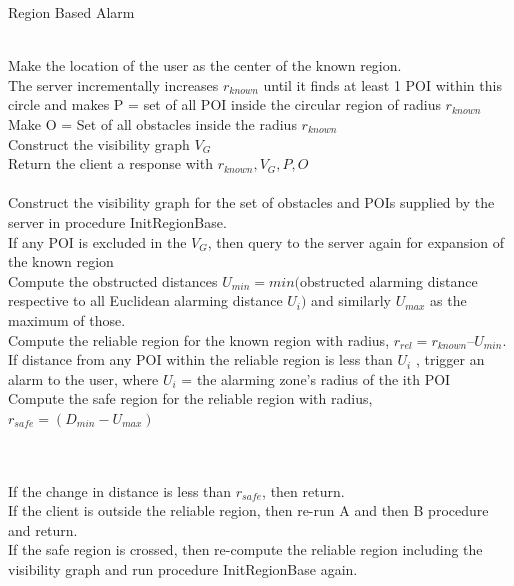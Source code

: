 \documentclass{sig-alternate}
\begin{document}
\begin{algorithm}
\caption{Region Based Alarm}
\label{InitRegionBase}
\begin{algorithmic}[1]
\\ Make the location of the user as the center of the known region. 
\\ The server incrementally increases $r_{known}$ until it finds at least 1 POI within this circle and makes P = {set of all POI inside the circular region of radius $r_{known}$}
\\ Make O = {Set of all obstacles inside the radius $r_{known}$}
\\ Construct the visibility graph $V_G$
\\ Return the client a response with ${r_{known}, V_G, P, O}$
\EndProcedure
\\
\\ Construct the visibility graph for the set of obstacles and POIs supplied by the server in procedure InitRegionBase.
\\ If any POI is excluded in the $V_G$, then query to the server again for expansion of the known region
\\ Compute the obstructed distances $U_{min} = min($obstructed alarming distance respective to all Euclidean alarming distance $U_i )$ and similarly $U_{max}$ as the maximum of those.
\\ Compute the reliable region for the known region with radius, $r_{rel}  = r_{known} – U_{min}$.
\\ If distance from any POI within the reliable region is less than $U_{i}$ , trigger an alarm to the user, where $U_{i}$ = the alarming zone's radius of the ith POI
\\ Compute the safe region for the reliable region with radius, $r_{safe} = (D_{min}-U_{max})$ 
\EndProcedure

\\
\\ If the change in distance is less than $r_{safe}$, then return.
\\ If the client is outside the reliable region, then re-run A and then B procedure and return.
\\ If the safe region is crossed, then re-compute the reliable region including the visibility graph and run procedure InitRegionBase again.
\EndProcedure
\end{algorithmic}
\end{algorithm}
\end{document}
